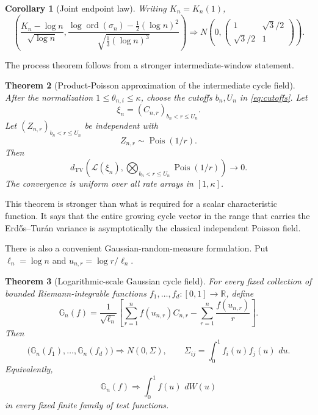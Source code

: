 \documentclass[11pt]{article}
\newtheorem{theorem}{Theorem}[section]
\newtheorem{corollary}[theorem]{Corollary}
\theoremstyle{definition}
\theoremstyle{remark}
\newcommand{\dd}{\,d}
\newcommand{\Pois}{\operatorname{Pois}}
\newcommand{\ord}{\operatorname{ord}}
\newcommand{\TV}{\mathrm{TV}}
\newcommand{\cL}{\mathcal L}
\newcommand{\R}{\mathbb R}
\begin{document}
\begin{corollary}[Joint endpoint law]
\label{cor:endpoint-joint}
Writing $K_n=K_n(1)$,
\begin{equation}\label{eq:endpoint-joint}
 \boxed{
 \left(
 \frac{K_n-\log n}{\sqrt{\log n}},
 \frac{\log\ord(\sigma_n)-\frac12(\log n)^2}
      {\sqrt{\frac13(\log n)^3}}
 \right)
 \Rightarrow
 N\!\left(0,
 \begin{pmatrix}
 1&\sqrt3/2\\[1mm]
 \sqrt3/2&1
 \end{pmatrix}\right).}
\end{equation}
\end{corollary}

The process theorem follows from a stronger intermediate-window statement.

\begin{theorem}[Product-Poisson approximation of the intermediate cycle field]
\label{thm:TV-main}
After the normalization $1\le\theta_{n,i}\le\kappa$, choose the cutoffs
$b_n,U_n$ in \eqref{eq:cutoffs}.  Let
\[
 \xi_n=(C_{n,r})_{b_n<r\le U_n}.
\]
Let $(Z_{n,r})_{b_n<r\le U_n}$ be independent with
\[
 Z_{n,r}\sim\Pois(1/r).
\]
Then
\begin{equation}\label{eq:TV-main}
 \boxed{
 d_{\TV}\left(
 \cL(\xi_n),
 \bigotimes_{b_n<r\le U_n}\Pois(1/r)
 \right)\longrightarrow0.}
\end{equation}
The convergence is uniform over all rate arrays in $[1,\kappa]$.
\end{theorem}

This theorem is stronger than what is required for a scalar characteristic
function.  It says that the entire growing cycle vector in the range that
carries the Erd\H{o}s--Tur\'an variance is asymptotically the classical
independent Poisson field.

There is also a convenient Gaussian-random-measure formulation.  Put
$\ell_n=\log n$ and $u_{n,r}=\log r/\ell_n$.

\begin{theorem}[Logarithmic-scale Gaussian cycle field]
\label{thm:isonormal}
For every fixed collection of bounded Riemann-integrable functions
$f_1,\ldots,f_d:[0,1]\to\R$, define
\begin{equation}\label{eq:Gn-f}
 \mathbb G_n(f)
 =\frac1{\sqrt{\ell_n}}
 \left[
 \sum_{r=1}^n f(u_{n,r})C_{n,r}
 -\sum_{r=1}^n\frac{f(u_{n,r})}{r}
 \right].
\end{equation}
Then
\begin{equation}\label{eq:isonormal}
 \bigl(\mathbb G_n(f_1),\ldots,\mathbb G_n(f_d)\bigr)
 \Rightarrow N(0,\Sigma),
 \qquad
 \Sigma_{ij}=\int_0^1f_i(u)f_j(u)\,\dd u.
\end{equation}
Equivalently,
\[
 \mathbb G_n(f)\Rightarrow\int_0^1 f(u)\,\dd W(u)
\]
in every fixed finite family of test functions.
\end{theorem}
\end{document}
